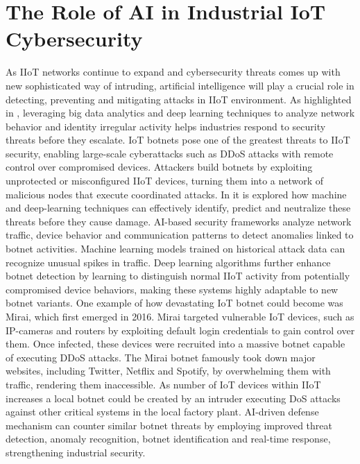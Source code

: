 \documentclass[article,a4paper]{IEEEtran}
\begin{document}
\section{The Role of AI in Industrial IoT Cybersecurity}
As IIoT networks continue to expand and cybersecurity threats comes up with new sophisticated way of intruding, artificial intelligence will play a crucial role in detecting, preventing and mitigating attacks in IIoT environment. As highlighted in \cite{Deeplearning}, leveraging big data analytics and deep learning techniques to analyze network behavior and identity irregular activity helps industries respond to security threats before they escalate. 
\newline\newline
IoT botnets pose one of the greatest threats to IIoT security, enabling large-scale cyberattacks such as DDoS attacks with remote control over compromised devices. Attackers build botnets by exploiting unprotected or misconfigured IIoT devices, turning them into a network of malicious nodes that execute coordinated attacks. In \cite{botnets} it is explored how machine and deep-learning techniques can effectively identify, predict and neutralize these threats before they cause damage. 
\newline\newline
AI-based security frameworks analyze network traffic, device behavior and communication patterns to detect anomalies linked to botnet activities. Machine learning models trained on historical attack data can recognize unusual spikes in traffic. Deep learning algorithms further enhance botnet detection by learning to distinguish normal IIoT activity from potentially compromised device behaviors, making these systems highly adaptable to new botnet variants. 
\newline\newline
One example \cite{Mirai} of how devastating IoT botnet could become was Mirai, which first emerged in 2016. Mirai targeted vulnerable IoT devices, such as IP-cameras and routers by exploiting default login credentials to gain control over them. Once infected, these devices were recruited into a massive botnet capable of executing DDoS attacks. The Mirai botnet famously took down major websites, including Twitter, Netflix and Spotify, by overwhelming them with traffic, rendering them inaccessible. As number of IoT devices within IIoT increases a local botnet could be created by an intruder executing DoS attacks against other critical systems in the local factory plant. 
\newline
AI-driven defense mechanism can counter similar botnet threats by employing improved threat detection, anomaly recognition, botnet identification and real-time response, strengthening industrial security. 
\end{document}

